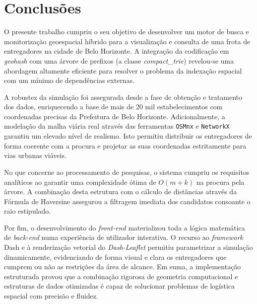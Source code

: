 \documentclass[12pt,a4paper]{article}
\begin{document}
\section{Conclusões}
O presente trabalho cumpriu o seu objetivo de desenvolver um motor de busca e monitorização geoespacial híbrido para a visualização e consulta de uma frota de entregadores na cidade de Belo Horizonte. A integração da codificação em \textit{geohash} com uma árvore de prefixos (a classe \textit{compact\_trie}) revelou-se uma abordagem altamente eficiente para resolver o problema da indexação espacial com um mínimo de dependências externas.

A robustez da simulação foi assegurada desde a fase de obtenção e tratamento dos dados, enriquecendo a base de mais de 20 mil estabelecimentos com coordenadas precisas da Prefeitura de Belo Horizonte. Adicionalmente, a modelação da malha viária real através das ferramentas \texttt{OSMnx} e \texttt{NetworkX} garantiu um elevado nível de realismo. Isto permitiu distribuir os entregadores de forma coerente com a procura e projetar as suas coordenadas estritamente para vias urbanas viáveis.

No que concerne ao processamento de pesquisas, o sistema cumpriu os requisitos analíticos ao garantir uma complexidade ótima de $O(m + k)$ na procura pela árvore. A combinação desta estrutura com o cálculo de distâncias através da Fórmula de Haversine assegurou a filtragem imediata dos candidatos consoante o raio estipulado.

Por fim, o desenvolvimento do \textit{front-end} materializou toda a lógica matemática de \textit{back-end} numa experiência de utilizador interativa. O recurso ao \textit{framework} Dash e à renderização vetorial do \textit{Dash-Leaflet} permitiu parametrizar a simulação dinamicamente, evidenciando de forma visual e clara os entregadores que cumprem ou não as restrições da área de alcance. Em suma, a implementação estruturada provou que a combinação rigorosa de geometria computacional e estruturas de dados otimizadas é capaz de solucionar problemas de logística espacial com precisão e fluidez.

\end{document}
